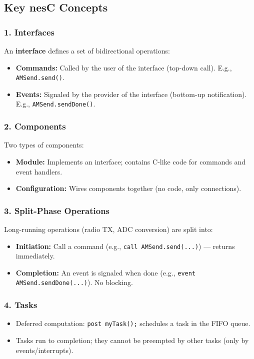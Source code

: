 \documentclass[12pt,a4paper]{article}
\begin{document}
\subsection{Key nesC Concepts}

\subsubsection*{1. Interfaces}
An \textbf{interface} defines a set of bidirectional operations:
\begin{itemize}[leftmargin=*, itemsep=2pt]
  \item \textbf{Commands:} Called by the user of the interface (top-down call). E.g., \texttt{AMSend.send()}.
  \item \textbf{Events:} Signaled by the provider of the interface (bottom-up notification). E.g., \texttt{AMSend.sendDone()}.
\end{itemize}

\subsubsection*{2. Components}
Two types of components:
\begin{itemize}[leftmargin=*, itemsep=2pt]
  \item \textbf{Module:} Implements an interface; contains C-like code for commands and event handlers.
  \item \textbf{Configuration:} Wires components together (no code, only connections).
\end{itemize}

\subsubsection*{3. Split-Phase Operations}
Long-running operations (radio TX, ADC conversion) are split into:
\begin{itemize}[itemsep=2pt]
  \item \textbf{Initiation:} Call a command (e.g., \texttt{call AMSend.send(...)}) --- returns immediately.
  \item \textbf{Completion:} An event is signaled when done (e.g., \texttt{event AMSend.sendDone(...)}). No blocking.
\end{itemize}

\subsubsection*{4. Tasks}
\begin{itemize}[itemsep=2pt]
  \item Deferred computation: \texttt{post myTask();} schedules a task in the FIFO queue.
  \item Tasks run to completion; they cannot be preempted by other tasks (only by events/interrupts).
\end{itemize}
\end{document}
